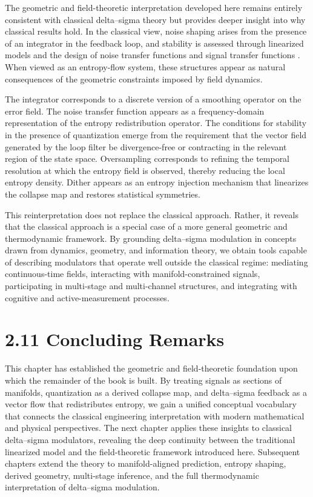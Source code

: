The geometric and field-theoretic interpretation developed here remains entirely consistent with classical delta--sigma theory but provides deeper insight into why classical results hold. In the classical view, noise shaping arises from the presence of an integrator in the feedback loop, and stability is assessed through linearized models and the design of noise transfer functions and signal transfer functions \citep{schreier2005understanding}. When viewed as an entropy-flow system, these structures appear as natural consequences of the geometric constraints imposed by field dynamics.

The integrator corresponds to a discrete version of a smoothing operator on the error field. The noise transfer function appears as a frequency-domain representation of the entropy redistribution operator. The conditions for stability in the presence of quantization emerge from the requirement that the vector field generated by the loop filter be divergence-free or contracting in the relevant region of the state space. Oversampling corresponds to refining the temporal resolution at which the entropy field is observed, thereby reducing the local entropy density. Dither appears as an entropy injection mechanism that linearizes the collapse map and restores statistical symmetries.

This reinterpretation does not replace the classical approach. Rather, it reveals that the classical approach is a special case of a more general geometric and thermodynamic framework. By grounding delta--sigma modulation in concepts drawn from dynamics, geometry, and information theory, we obtain tools capable of describing modulators that operate well outside the classical regime: mediating continuous-time fields, interacting with manifold-constrained signals, participating in multi-stage and multi-channel structures, and integrating with cognitive and active-measurement processes.

\section*{2.11 Concluding Remarks}

This chapter has established the geometric and field-theoretic foundation upon which the remainder of the book is built. By treating signals as sections of manifolds, quantization as a derived collapse map, and delta--sigma feedback as a vector flow that redistributes entropy, we gain a unified conceptual vocabulary that connects the classical engineering interpretation with modern mathematical and physical perspectives. The next chapter applies these insights to classical delta--sigma modulators, revealing the deep continuity between the traditional linearized model and the field-theoretic framework introduced here. Subsequent chapters extend the theory to manifold-aligned prediction, entropy shaping, derived geometry, multi-stage inference, and the full thermodynamic interpretation of delta--sigma modulation.
